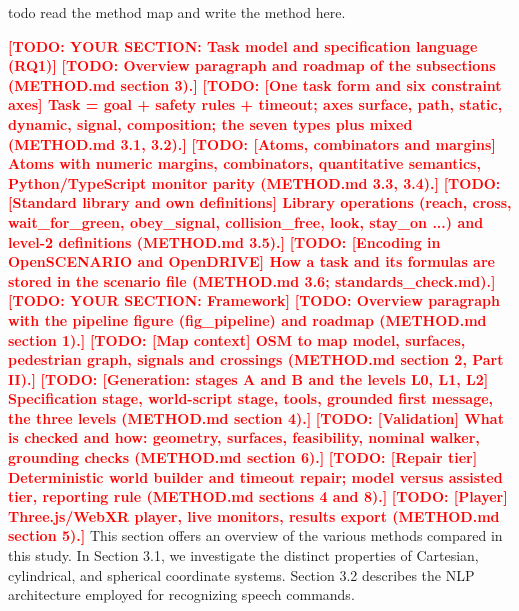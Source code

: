 \documentclass[preprint,12pt]{elsarticle}
\newcommand{\reftext}[1]{{\color{gray}#1}}   %
\newcommand{\todo}[1]{\textcolor{red}{\textbf{[TODO: #1]}}}
\begin{document}
todo read the method map and write the method here.

\todo{YOUR SECTION: Task model and specification language (RQ1)}
\todo{Overview paragraph and roadmap of the subsections (METHOD.md section 3).}
\todo{[One task form and six constraint axes] Task = goal + safety rules + timeout; axes surface, path, static, dynamic, signal, composition; the seven types plus mixed (METHOD.md 3.1, 3.2).}
\todo{[Atoms, combinators and margins] Atoms with numeric margins, combinators, quantitative semantics, Python/TypeScript monitor parity (METHOD.md 3.3, 3.4).}
\todo{[Standard library and own definitions] Library operations (reach, cross, wait\_for\_green, obey\_signal, collision\_free, look, stay\_on ...) and level-2 definitions (METHOD.md 3.5).}
\todo{[Encoding in OpenSCENARIO and OpenDRIVE] How a task and its formulas are stored in the scenario file (METHOD.md 3.6; standards\_check.md).}
\todo{YOUR SECTION: Framework}
\todo{Overview paragraph with the pipeline figure (fig\_pipeline) and roadmap (METHOD.md section 1).}
\todo{[Map context] OSM to map model, surfaces, pedestrian graph, signals and crossings (METHOD.md section 2, Part II).}
\todo{[Generation: stages A and B and the levels L0, L1, L2] Specification stage, world-script stage, tools, grounded first message, the three levels (METHOD.md section 4).}
\todo{[Validation] What is checked and how: geometry, surfaces, feasibility, nominal walker, grounding checks (METHOD.md section 6).}
\todo{[Repair tier] Deterministic world builder and timeout repair; model versus assisted tier, reporting rule (METHOD.md sections 4 and 8).}
\todo{[Player] Three.js/WebXR player, live monitors, results export (METHOD.md section 5).}
\reftext{This section offers an overview of the various methods compared in this study. In Section 3.1, we investigate the distinct properties of Cartesian, cylindrical, and spherical coordinate systems. Section 3.2 describes the NLP architecture employed for recognizing speech commands.}
\end{document}
